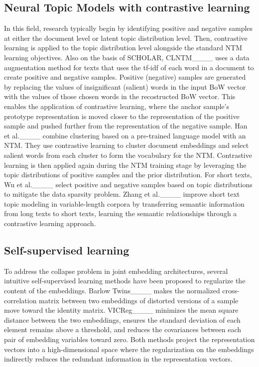 \subsection{Neural Topic Models with contrastive learning}
In this field, research typically begin by identifying positive and negative samples at either the document level or latent topic distribution level. Then, contrastive learning is applied to the topic distribution level alongside the standard NTM learning objectives. 
Also on the basis of SCHOLAR, CLNTM____ uses a data augmentation method for texts that uses the tf-idf of each word in a document to create positive and negative samples. Positive (negative) samples are generated by replacing the values of insignificant (salient) words in the input BoW vector with the values of those chosen words in the recostructed BoW vector. This enables the application of contrastive learning, where the anchor sample's prototype representation is moved closer to the representation of the positive sample and pushed further from the representation of the negative sample.
Han et al.____ combine clustering based on a pre-trained language model with an NTM. They use contrastive learning to cluster document embeddings and select salient words from each cluster to form the vocabulary for the NTM. Contrastive learning is then applied again during the NTM training stage by leveraging the topic distributions of positive samples and the prior distribution.
For short texts, Wu et al.____ select positive and negative samples based on topic distributions to mitigate the data sparsity problem. 
Zhang et al.____ improve short text topic modeling in variable-length corpora by transferring semantic information from long texts to short texts, learning the semantic relationships through a contrastive learning approach.


\subsection{Self-supervised learning}
To address the collapse problem in joint embedding architectures, several intuitive self-supervised learning methods have been proposed to regularize the content of the embeddings.
Barlow Twins____ makes the normalized cross-correlation matrix between two embeddings of distorted versions of a sample move toward the identity matrix.
VICReg____ minimizes the mean square distance between the two embeddings, ensures the standard deviation of each element remains above a threshold, and reduces the covariances between each pair of embedding variables toward zero.
Both methods project the representation vectors into a high-dimensional space where the regularization on the embeddings indirectly reduces the redundant information in the representation vectors.